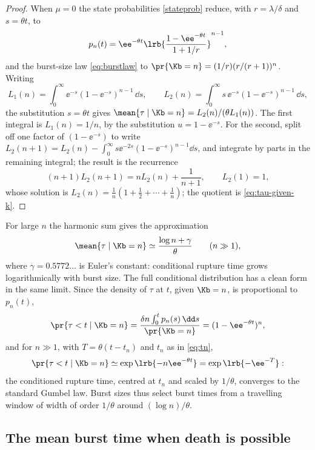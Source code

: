 \begin{proof}
When $\mu=0$ the state probabilities \eqref{stateprob} reduce, with
$r=\lambda/\delta$ and $s=\theta t$, to
$$p_n(t)=\ee^{-\theta t}\lrb{\frac{1-\ee^{-\theta t}}{1+1/r}}^{n-1},$$
and the burst-size law \eqref{eq:burstlaw} to
$\pr{\Kb=n}=(1/r)(r/(r+1))^n$. Writing
$$L_1(n)=\int_0^\infty \ee^{-s}(1-\ee^{-s})^{n-1}\,\dd s,\qquad
L_2(n)=\int_0^\infty s\,\ee^{-s}(1-\ee^{-s})^{n-1}\,\dd s,$$
the substitution $s=\theta t$ gives
$\mean{\tau\mid\Kb=n}=L_2(n)/(\theta L_1(n))$. The first integral is
$L_1(n)=1/n$, by the substitution $u=1-\ee^{-s}$. For the second, split off
one factor of $(1-\ee^{-s})$ to write
$L_2(n+1)=L_2(n)-\int_0^\infty s\ee^{-2s}(1-\ee^{-s})^{n-1}\dd s$, and
integrate by parts in the remaining integral; the result is the recurrence
$$(n+1)L_2(n+1)=nL_2(n)+\frac{1}{n+1},\qquad L_2(1)=1,$$
whose solution is $L_2(n)=\frac{1}{n}(1+\frac12+\cdots+\frac1n)$; the
quotient is \eqref{eq:tau-given-k}.
\end{proof}

For large $n$ the harmonic sum gives the approximation
\begin{equation}
\mean{\tau\mid\Kb=n}\simeq\frac{\log n+\gamma}{\theta}\qquad(n\gg1),
\label{eq:tau-given-k-asymp}
\end{equation}
where $\gamma=0.5772\ldots$ is Euler's constant: conditional rupture time
grows logarithmically with burst size. The full conditional distribution has
a clean form in the same limit. Since the density of $\tau$ at $t$, given
$\Kb=n$, is proportional to $p_n(t)$,
\begin{equation}
\pr{\tau<t\mid\Kb=n}
=\frac{\delta n\int_0^t p_n(s)\,\dd s}{\pr{\Kb=n}}
=(1-\ee^{-\theta t})^n,
\label{eq:cond-cdf}
\end{equation}
and for $n\gg1$, with $T=\theta(t-t_n)$ and $t_n$ as in \eqref{eq:tn},
\begin{equation}
\pr{\tau<t\mid\Kb=n}\simeq\exp\lrb{-n\ee^{-\theta t}}
=\exp\lrb{-\ee^{-T}}:
\end{equation}
the conditioned rupture time, centred at $t_n$ and scaled by $1/\theta$,
converges to the standard Gumbel law. Burst sizes thus select burst times
from a travelling window of width of order $1/\theta$ around
$(\log n)/\theta$.

\subsection{The mean burst time when death is possible}
\label{sec:tau-burst-mu-pos}

